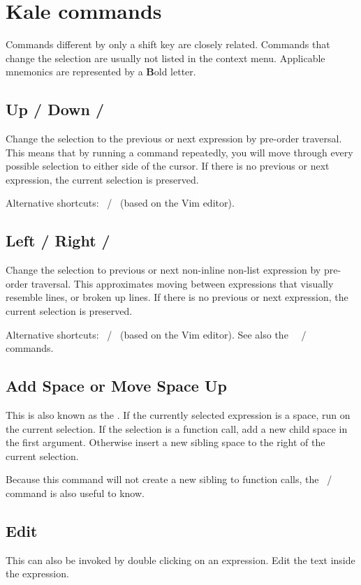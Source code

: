 \chapter{Kale commands}
\newcommand{\shortcut}[3]{\section[#1]{#1 \hfill #2}\label{cmd:#3}}
\newcommand{\pskip}[1]{{\bigskip\par\noindent #1}}

Commands different by only a shift key \keys{\shift} are closely
related. Commands that change the selection are usually not listed in the
context menu. Applicable mnemonics are represented by a \textbf{B}old
letter.

\shortcut{Up / Down}{\ak{^} / }{up_down}
Change the selection to the previous or next expression by pre-order traversal.
This means that by running a command repeatedly, you will move through every
possible selection to either side of the cursor. If there is no previous or
next expression, the current selection is preserved.
\pskip{Alternative shortcuts: ~/~ (based on the Vim editor).}

\shortcut{Left / Right}{\ak{<} / \ak{>}}{left_right}
Change the selection to previous or next non-inline non-list expression by
pre-order traversal. This approximates moving between expressions that visually
resemble lines, or broken up lines. If there is no previous or next expression,
the current selection is preserved.
\pskip{%
Alternative shortcuts: ~/~ (based on the Vim editor).
See also the
\hyperref[cmd:left_right_sibling]{\say{Left / Right Sibling}}%
~{\keys{\shift + H}~/~\keys{\shift + L}}
commands.
}

\shortcut{Add Space or Move Space Up}{\keys{\SPACE}}{smart_space}
This is also known as the . If the currently selected
expression is a space, run \hyperref[cmd:move_up]{} on the
current selection. If the selection is a function call, add a new
child space in the first argument. Otherwise insert a new sibling
space to the right of the current selection.

Because this command will not create a new sibling to function calls, the 
\hyperref[cmd:new_line]{}
~/~ 
command is also useful to know.

\shortcut{Edit}{\keys{\return}}{edit}
This can also be invoked by double clicking on an expression. Edit the text
inside the expression.

